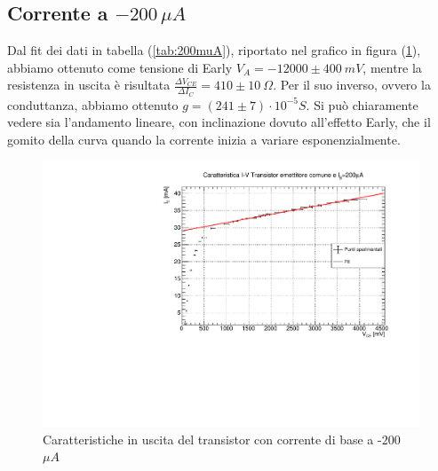 \documentclass[]{article}
\begin{document}
  \subsection{Corrente a $ -200\,\mu A $}
Dal fit dei dati in tabella (\ref{tab:200muA}), riportato nel grafico in figura (\ref{fig:corrente 200}), abbiamo ottenuto come tensione di Early $ V_{A}=-12000\pm400\ mV $, mentre la resistenza in uscita è risultata $ \frac{\Delta V_{CE}}{\Delta I _{C}}=410\pm10\ \Omega$. Per il suo inverso, ovvero la conduttanza, abbiamo ottenuto $ g=(241\pm7)\cdot 10^{-5} S$. Si può chiaramente vedere sia l'andamento lineare, con inclinazione dovuto all'effetto Early, che il gomito della curva quando la corrente inizia a variare esponenzialmente.
\begin{figure}[H]
	\centering
	\includegraphics[width=0.9\linewidth]{../200 muA/c1}
	\caption{Caratteristiche in uscita del transistor con corrente di base a -200 $ \mu A $}
	\label{fig:corrente 200}
\end{figure}
\end{document}
